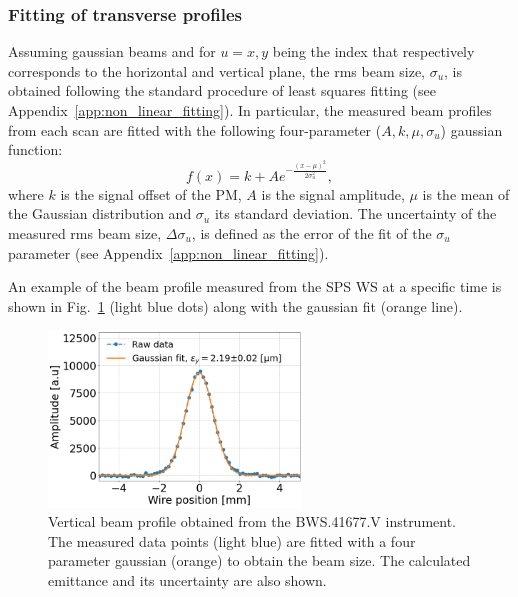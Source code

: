 \subsubsection*{Fitting of transverse profiles}
Assuming gaussian beams and for $u=x,y$ being the index that respectively corresponds to the horizontal and vertical plane, the rms beam size, $\sigma_u$, is obtained following the standard procedure of least squares fitting (see Appendix~\ref{app:non_linear_fitting}). In particular, the measured beam profiles from each scan are fitted with the following four-parameter ($A, k, \mu, \sigma_u$) gaussian function:
\begin{equation}\label{eq:4p_gauss}
   f(x) = k + A e^{-\frac{(x-\mu)^2}{2 \sigma_u^2}},
\end{equation}
where $k$ is the signal offset of the PM, $A$ is the signal amplitude, $\mu$ is the mean of the Gaussian distribution and $\sigma_u$ its standard deviation. The uncertainty of the measured rms beam size, $\Delta \sigma_u$, is defined as the error of the fit of the $\sigma_u$ parameter (see Appendix~\ref{app:non_linear_fitting}).


An example of the beam profile measured from the SPS WS at a specific time is shown in Fig.~\ref{fig:WS_example_V_profile} (light blue dots) along with the gaussian fit (orange line).
\begin{figure}[!h]
   \centering         
   \includegraphics[width=0.6\textwidth]{images/Ch5/SPS.BWS.41677.V_ROT_2018-09-05 15_45_01.33500_raw_and_fit.png}
       \caption{Vertical beam profile obtained from the BWS.41677.V instrument. The measured data points (light blue) are fitted with a four parameter gaussian (orange) to obtain the beam size. The calculated emittance and its uncertainty are also shown.}
       \label{fig:WS_example_V_profile}
\end{figure}
   
